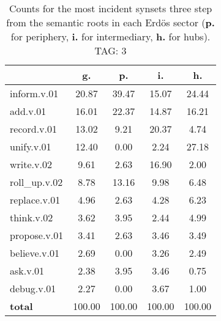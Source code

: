 \begin{table}[h!]
\begin{center}
\begin{tabular}{| l || c | c | c | c |}\hline
 & {\bf g.} & {\bf p.} & {\bf i.} & {\bf h.} \\\hline\hline
inform.v.01 & 20.87  & 39.47  & 15.07  & 24.44 \\\hline
add.v.01 & 16.01  & 22.37  & 14.87  & 16.21 \\\hline
record.v.01 & 13.02  & 9.21  & 20.37  & 4.74 \\\hline
unify.v.01 & 12.40  & 0.00  & 2.24  & 27.18 \\\hline
write.v.02 & 9.61  & 2.63  & 16.90  & 2.00 \\\hline
roll\_up.v.02 & 8.78  & 13.16  & 9.98  & 6.48 \\\hline
replace.v.01 & 4.96  & 2.63  & 4.28  & 6.23 \\\hline
think.v.02 & 3.62  & 3.95  & 2.44  & 4.99 \\\hline
propose.v.01 & 3.41  & 2.63  & 3.46  & 3.49 \\\hline
believe.v.01 & 2.69  & 0.00  & 3.26  & 2.49 \\\hline
ask.v.01 & 2.38  & 3.95  & 3.46  & 0.75 \\\hline
debug.v.01 & 2.27  & 0.00  & 3.67  & 1.00 \\\hline\hline
{{\bf total}} & 100.00  & 100.00  & 100.00  & 100.00 \\\hline
\end{tabular}
\caption{Counts for the most incident synsets three step from the semantic roots in each Erd\"os sector ({\bf p.} for periphery, {\bf i.} for intermediary, {\bf h.} for hubs). TAG: 3}
\end{center}
\end{table}